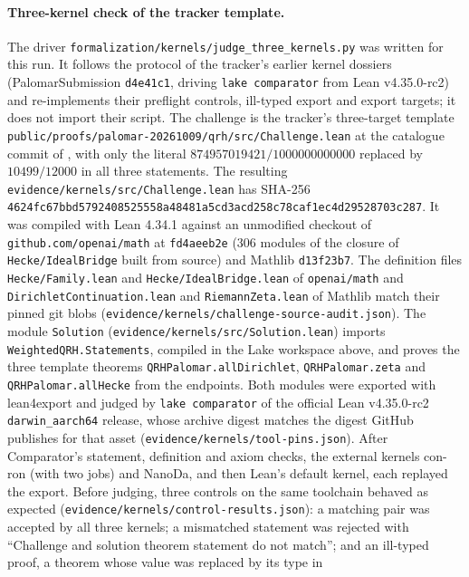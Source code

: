\documentclass[11pt]{article}
\begin{document}
\paragraph{Three-kernel check of the tracker template.}
The driver \nolinkurl{formalization/kernels/judge_three_kernels.py} was
written for this run. It follows the protocol of the tracker's earlier
kernel dossiers (PalomarSubmission \nolinkurl{d4e41c1}, driving
\texttt{lake comparator} from Lean v4.35.0-rc2) and re-implements their
preflight controls, ill-typed export and export targets; it does not
import their script. The challenge is the tracker's three-target template
\nolinkurl{public/proofs/palomar-20261009/qrh/src/Challenge.lean} at the
catalogue commit of \cite{tracker}, with only the literal
$874957019421/1000000000000$ replaced by $10499/12000$ in all three
statements. The resulting \nolinkurl{evidence/kernels/src/Challenge.lean}
has SHA-256
\nolinkurl{4624fc67bbd5792408525558a48481a5cd3acd258c78caf1ec4d29528703c287}.
It was compiled with Lean 4.34.1 against an unmodified checkout of
\nolinkurl{github.com/openai/math} at \nolinkurl{fd4aeeb2e} (306 modules
of the closure of \nolinkurl{Hecke/IdealBridge} built from source) and
Mathlib \nolinkurl{d13f23b7}. The definition files
\nolinkurl{Hecke/Family.lean} and \nolinkurl{Hecke/IdealBridge.lean} of
\nolinkurl{openai/math} and \nolinkurl{DirichletContinuation.lean} and
\nolinkurl{RiemannZeta.lean} of Mathlib match their pinned git blobs
(\nolinkurl{evidence/kernels/challenge-source-audit.json}). The module
\nolinkurl{Solution} (\nolinkurl{evidence/kernels/src/Solution.lean})
imports \nolinkurl{WeightedQRH.Statements}, compiled in the Lake
workspace above, and proves the three template theorems
\nolinkurl{QRHPalomar.allDirichlet}, \nolinkurl{QRHPalomar.zeta} and
\nolinkurl{QRHPalomar.allHecke} from the endpoints. Both modules were
exported with lean4export and judged by \texttt{lake comparator} of the
official Lean v4.35.0-rc2 \nolinkurl{darwin_aarch64} release, whose
archive digest matches the digest GitHub publishes for that asset
(\nolinkurl{evidence/kernels/tool-pins.json}). After Comparator's
statement, definition and axiom checks, the external kernels con-ron
(with two jobs) and NanoDa, and then Lean's default kernel, each
replayed the export. Before judging, three controls on the same toolchain behaved as
expected (\nolinkurl{evidence/kernels/control-results.json}): a matching
pair was accepted by all three kernels; a mismatched statement was
rejected with ``Challenge and solution theorem statement do not match'';
and an ill-typed proof, a theorem whose value was replaced by its type in
\end{document}
